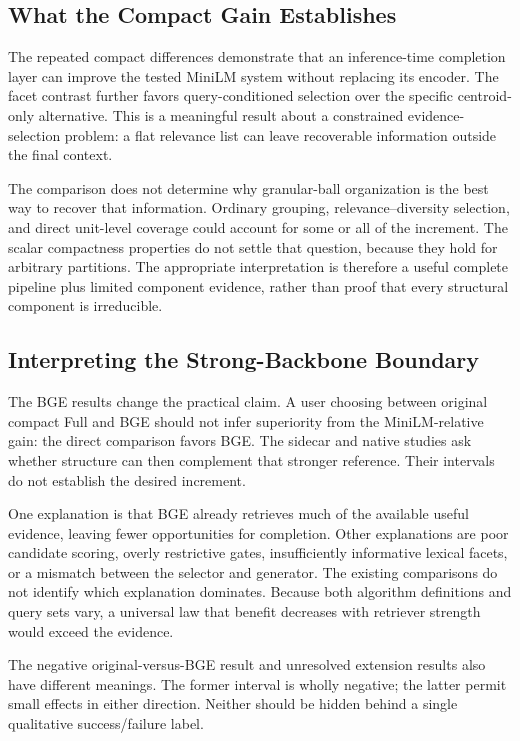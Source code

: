 \documentclass[11pt,a4paper]{article}
\begin{document}
\subsection{What the Compact Gain Establishes}
The repeated compact differences demonstrate that an inference-time
completion layer can improve the tested MiniLM system without replacing
its encoder. The facet contrast further favors query-conditioned selection
over the specific centroid-only alternative. This is a meaningful result
about a constrained evidence-selection problem: a flat relevance list can
leave recoverable information outside the final context.

The comparison does not determine why granular-ball organization is the best
way to recover that information. Ordinary grouping, relevance--diversity
selection, and direct unit-level coverage could account for some or all of
the increment. The scalar compactness properties do not settle that
question, because they hold for arbitrary partitions. The appropriate
interpretation is therefore a useful complete pipeline plus limited
component evidence, rather than proof that every structural component is
irreducible.

\subsection{Interpreting the Strong-Backbone Boundary}
The BGE results change the practical claim. A user choosing between original
compact Full and BGE should not infer superiority from the MiniLM-relative
gain: the direct comparison favors BGE. The sidecar and native studies ask
whether structure can then complement that stronger reference. Their
intervals do not establish the desired increment.

One explanation is that BGE already retrieves much of the available useful
evidence, leaving fewer opportunities for completion. Other explanations are
poor candidate scoring, overly restrictive gates, insufficiently informative
lexical facets, or a mismatch between the selector and generator.
The existing comparisons do not identify which explanation dominates.
Because both algorithm definitions and query sets vary, a universal law that
benefit decreases with retriever strength would exceed the evidence.

The negative original-versus-BGE result and unresolved extension results
also have different meanings. The former interval is wholly negative; the
latter permit small effects in either direction. Neither should be hidden
behind a single qualitative success/failure label.
\end{document}
